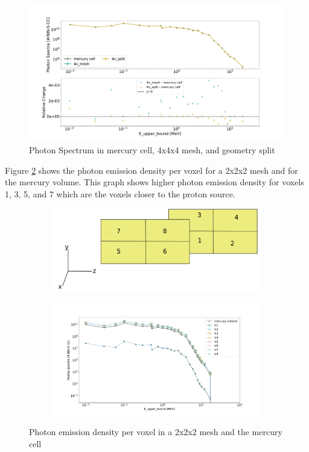 \begin{figure}[H]
 \centering
 \includegraphics[scale=0.4,trim={2cm 0.5cm 3cm 2cm},clip]{../figs/toy_p1/spec_VPI_4x.pdf}
 \caption{Photon Spectrum in mercury cell, 4x4x4 mesh, and geometry split}
 \label{fig:1spec_cell_4x}
\end{figure}
%
Figure \ref{fig:1spec_8v} shows the photon emission density per voxel for a
2x2x2 mesh and for the mercury volume. This graph shows higher photon emission
density for voxels 1, 3, 5, and 7 which are the voxels closer to the proton
source.
\begin{figure}[H]
	\begin{subfigure}[t]{1.0\textwidth}
		\hfill
		\includegraphics[scale=0.4, trim={0cm 0cm 0cm 0cm},clip]{../figs/voxels.png}
	\end{subfigure}\hfill
	\begin{subfigure}[t]{1.0\textwidth}
		\centering
		\includegraphics[scale=0.4, trim={2.5cm 1cm 3cm 3cm},clip]{../figs/toy_p1/spec_VPI_8.pdf}
	\end{subfigure}
	\caption{Photon emission density per voxel in a 2x2x2 mesh and the mercury cell}
	\label{fig:1spec_8v}
\end{figure}
